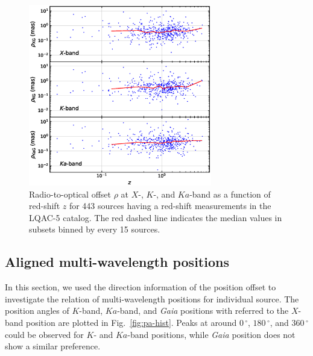 \documentclass{aa}
\begin{document}

    \begin{figure}[hbtp]
        \centering
        \includegraphics[width=80mm]{figs/rho-z}
        \caption[]{\label{fig:rho-z}
            Radio-to-optical offset $\rho$ at $X$-, $K$-, and $Ka$-band as a function of red-shift $z$ for 443 sources having a red-shift measurements in the LQAC-5 catalog.
            The red dashed line indicates the median values in subsets binned by every 15 sources.
        }
    \end{figure}




\subsection{Aligned multi-wavelength positions}    \label{subsec:pos-align}


    In this section, we used the direction information of the position offset to investigate the relation of multi-wavelength positions for individual source.
    The position angles of $K$-band, $Ka$-band, and \textit{Gaia} positions with referred to the $X$-band position are plotted in Fig.~\ref{fig:pa-hist}.
    Peaks at around $0\,^\circ$, $180\,^\circ$, and $360\,^\circ$ could be observed for $K$- and $Ka$-band positions, while \textit{Gaia} position does not show a similar preference.
\end{document}
